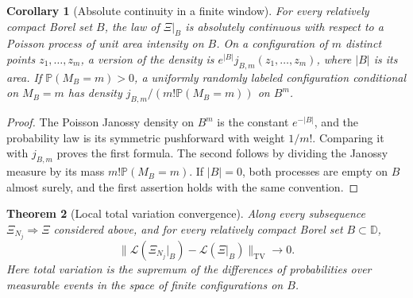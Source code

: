\documentclass[11pt,a4paper]{article}
\numberwithin{equation}{section}
\newtheorem{theorem}{Theorem}[section]
\newtheorem{corollary}[theorem]{Corollary}
\theoremstyle{definition}
\theoremstyle{remark}
\newcommand{\D}{\mathbb D}
\newcommand{\Pbb}{\mathbb P}
\begin{document}
\begin{corollary}[Absolute continuity in a finite window]
For every relatively compact Borel set $B$, the law of $\Xi|_B$ is
absolutely continuous with respect to a Poisson process of unit area
intensity on $B$. On a configuration of $m$ distinct points
$z_1,\ldots,z_m$, a version of the density is
$e^{|B|}j_{B,m}(z_1,\ldots,z_m)$, where $|B|$ is its area.
If $\Pbb(M_B=m)>0$, a uniformly randomly labeled configuration
conditional on $M_B=m$ has density
$j_{B,m}/(m!\Pbb(M_B=m))$ on $B^m$.
\end{corollary}
\begin{proof}
The Poisson Janossy density on $B^m$ is the constant $e^{-|B|}$,
and the probability law is its symmetric pushforward with weight
$1/m!$. Comparing it with $j_{B,m}$ proves the first formula.
The second follows by dividing the Janossy measure by its mass
$m!\Pbb(M_B=m)$. If $|B|=0$, both processes are empty on $B$ almost
surely, and the first assertion holds with the same convention.
\end{proof}

\begin{theorem}[Local total variation convergence]
\label{hier:local-tv}
Along every subsequence $\Xi_{N_j}\Rightarrow\Xi$ considered above,
and for every relatively compact Borel set $B\subset\D$,
\begin{equation}
 \bigl\|\mathcal L(\Xi_{N_j}|_B)-\mathcal L(\Xi|_B)
       \bigr\|_{\mathrm{TV}}\longrightarrow0.
 \label{hier:tv-convergence}
\end{equation}
Here total variation is the supremum of the differences of
probabilities over measurable events in the space of finite
configurations on $B$.
\end{theorem}
\end{document}

